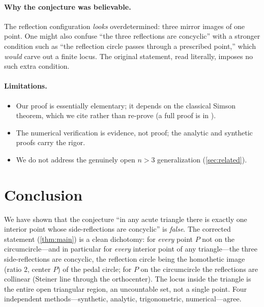 \documentclass[11pt,a4paper]{article}
\theoremstyle{definition}
\begin{document}
\paragraph{Why the conjecture was believable.} The reflection configuration \emph{looks} overdetermined: three mirror images of one point. One might also confuse ``the three reflections are concyclic'' with a stronger condition such as ``the reflection circle passes through a prescribed point,'' which \emph{would} carve out a finite locus. The original statement, read literally, imposes no such extra condition.

\paragraph{Limitations.}
\begin{itemize}
  \item Our proof is essentially elementary; it depends on the classical Simson theorem, which we cite rather than re-prove (a full proof is in \cite{Coxeter,Johnson}).
  \item The numerical verification is evidence, not proof; the analytic and synthetic proofs carry the rigor.
  \item We do not address the genuinely open $n>3$ generalization (\cref{sec:related}).
\end{itemize}

\section{Conclusion}\label{sec:conc}

We have shown that the conjecture ``in any acute triangle there is exactly one interior point whose side-reflections are concyclic'' is \emph{false}. The corrected statement (\cref{thm:main}) is a clean dichotomy: for \emph{every} point $P$ not on the circumcircle---and in particular for \emph{every} interior point of any triangle---the three side-reflections are concyclic, the reflection circle being the homothetic image (ratio $2$, center $P$) of the pedal circle; for $P$ on the circumcircle the reflections are collinear (Steiner line through the orthocenter). The locus inside the triangle is the entire open triangular region, an uncountable set, not a single point. Four independent methods---synthetic, analytic, trigonometric, numerical---agree.
\end{document}
